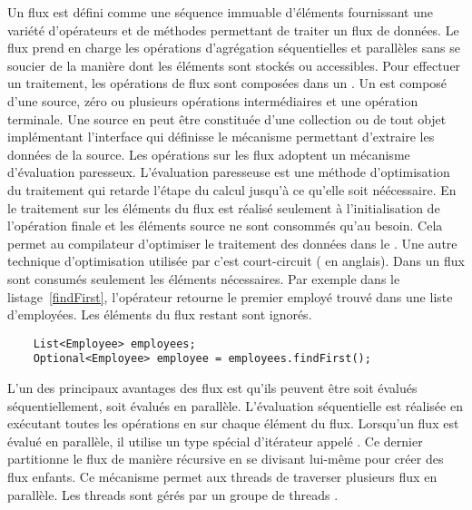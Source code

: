 Un flux est d\'efini comme une s\'equence immuable d'\'el\'ements fournissant une vari\'et\'e d'op\'erateurs et de m\'ethodes permettant de traiter un flux de donn\'ees. Le flux prend en charge les op\'erations d'agr\'egation \cite{javaStreamAggregate} s\'equentielles et parall\`eles sans se soucier de la mani\`ere dont les \'el\'ements sont stock\'es ou accessibles. Pour effectuer un traitement, les op\'erations de flux sont compos\'ees dans un . Un  est compos\'e d'une source, z\'ero ou plusieurs op\'erations interm\'ediaires et une op\'eration terminale. Une source en  peut \^etre constitu\'ee d'une collection ou de tout objet impl\'ementant l'interface qui d\'efinisse le m\'ecanisme permettant d'extraire les donn\'ees de la source. 
Les op\'erations sur les flux adoptent un m\'ecanisme d'\'evaluation paresseux. L'\'evaluation paresseuse est une m\'ethode d'optimisation du traitement qui retarde l'\'etape du calcul jusqu'\`a ce qu'elle soit n\'eécessaire. En  le traitement sur les \'el\'ements du flux est r\'ealis\'e seulement \`a l'initialisation de l'op\'eration finale et les \'el\'ements source ne sont consomm\'es qu'au besoin. Cela permet au compilateur d'optimiser le traitement des donn\'ees dans le .
Une autre technique d'optimisation utilis\'ee par  c'est court-circuit ( en anglais). Dans un flux sont consum\'es seulement les \'el\'ements n\'ecessaires. Par exemple dans le listage~\ref{findFirst}, l'opérateur  retourne le premier employ\'e trouv\'e dans une liste d'employ\'ees. Les \'el\'ements du flux restant sont ignor\'es.

\begin{Listing}[tbp]
\begin{lstlisting}
	List<Employee> employees;
	Optional<Employee> employee = employees.findFirst();
\end{lstlisting}
\caption{Optimisation du traitement d'un flux en utilisant la technique de court-circuit.}
\label{findFirst}
\end{Listing}

L'un des principaux avantages des flux est qu'ils peuvent \^etre soit \'evalu\'es s\'equentiellement, soit \'evalu\'es en parall\`ele. L'\'evaluation s\'equentielle est r\'ealis\'ee en ex\'ecutant toutes les op\'erations en  sur chaque \'el\'ement du flux. Lorsqu'un flux est \'evalu\'e en parall\`ele, il utilise un type sp\'ecial d'it\'erateur appel\'e . Ce dernier partitionne le flux de mani\`ere r\'ecursive en se divisant lui-m\^eme pour cr\'eer des flux enfants. Ce m\'ecanisme permet aux threads de traverser plusieurs flux en parall\`ele. Les threads sont g\'er\'es par un groupe de threads .


